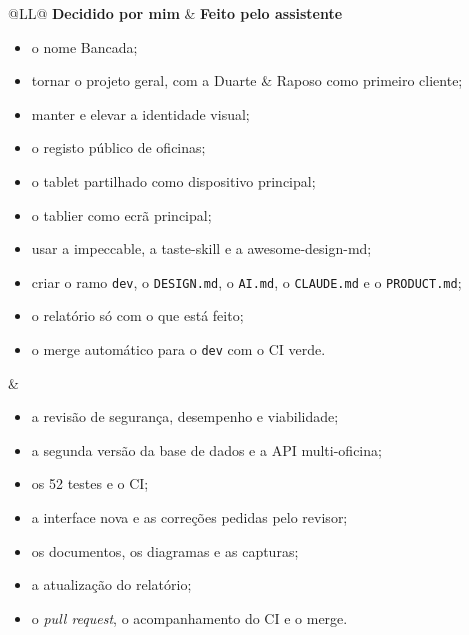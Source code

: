 \documentclass[a4paper,12pt]{article}
\begin{document}
\begin{table}[htbp]
\centering
\small
\begin{tabularx}{\textwidth}{@{}LL@{}}
\toprule
\textbf{Decidido por mim} & \textbf{Feito pelo assistente} \\
\midrule
\begin{itemize}[leftmargin=*,nosep,before=\vspace{-\baselineskip}]
  \item o nome Bancada;
  \item tornar o projeto geral, com a Duarte \& Raposo como primeiro cliente;
  \item manter e elevar a identidade visual;
  \item o registo público de oficinas;
  \item o tablet partilhado como dispositivo principal;
  \item o tablier como ecrã principal;
  \item usar a impeccable, a taste-skill e a awesome-design-md;
  \item criar o ramo \texttt{dev}, o \texttt{DESIGN.md}, o \texttt{AI.md}, o \texttt{CLAUDE.md} e o \texttt{PRODUCT.md};
  \item o relatório só com o que está feito;
  \item o merge automático para o \texttt{dev} com o CI verde.
\end{itemize}
&
\begin{itemize}[leftmargin=*,nosep,before=\vspace{-\baselineskip}]
  \item a revisão de segurança, desempenho e viabilidade;
  \item a segunda versão da base de dados e a API multi-oficina;
  \item os 52 testes e o CI;
  \item a interface nova e as correções pedidas pelo revisor;
  \item os documentos, os diagramas e as capturas;
  \item a atualização do relatório;
  \item o \textit{pull request}, o acompanhamento do CI e o merge.
\end{itemize}
\\
\bottomrule
\end{tabularx}
\caption{O que foi decidido pelo autor e o que foi feito pelo assistente na terceira fase.}
\label{tab:quem}
\end{table}
\end{document}
